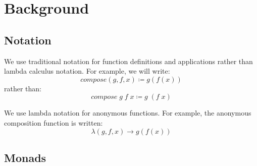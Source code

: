 \documentclass{article}
\begin{document}
% 
% 
 

\section{Background}
\label{section:Background}
 
\subsection{Notation}
\label{section:Background:Notation}

We use traditional notation for function definitions and applications rather than lambda calculus notation.
For example, we will write:
\begin{equation*}
compose(g, f, x) ≔ g(f(x))
\end{equation*}
rather than:
\begin{equation*}
compose\; g\; f\; x ≔ g\; (f\; x)
\end{equation*}

We use lambda notation for anonymous functions.
For example, the anonymous composition function is written:
\begin{equation*}
λ(g, f, x) → g(f(x))
\end{equation*}


\subsection{Monads}
\label{section:Background:Monads}
\end{document}

